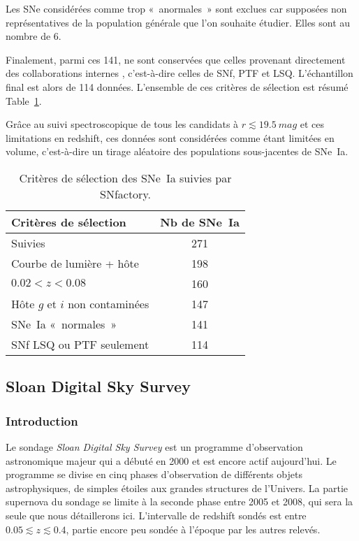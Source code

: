 \documentclass[../main/main.tex]{subfiles}
\begin{document}
Les SNe considérées comme trop «~anormales~» sont exclues car supposées non
représentatives de la population générale que l'on souhaite étudier. Elles sont
au nombre de 6.

Finalement, parmi ces 141, ne sont conservées que celles provenant directement
des collaborations internes , c'est-à-dire
celles de SNf, PTF et LSQ. L'échantillon final est alors de 114 données.  
L'ensemble de ces critères de sélection est résumé Table~\ref{tab:snfcuts}.

Grâce au suivi spectroscopique de tous les candidats à $r \lesssim
\SI{19.5}{mag}$ et ces limitations en redshift, ces données sont considérées
comme étant limitées en volume, c'est-à-dire un tirage aléatoire des populations
sous-jacentes de SNe~Ia.

\begin{table}[]
    \centering
    \caption{Critères de sélection des SNe~Ia suivies par SNfactory.}
    \label{tab:snfcuts}
    \begin{tabular}{lc}
        \toprule
        Critères de sélection           & Nb de SNe~Ia \\
        \midrule
        Suivies                         & 271 \\
        Courbe de lumière + hôte        & 198 \\
        $0.02 < z < 0.08$               & 160 \\
        Hôte $g$ et $i$ non contaminées & 147 \\
        SNe~Ia «~normales~»             & 141 \\
        SNf LSQ ou PTF seulement        & 114 \\
        \bottomrule
    \end{tabular}
\end{table}

\subsection{Sloan Digital Sky Survey}\label{ssec:sdss}
\subsubsection{Introduction}\label{sssec:sdssintro}

Le sondage \textit{Sloan Digital Sky Survey} \citep[SDSS,][?]{sako2008} est un
programme d'observation astronomique majeur qui a débuté en 2000 et est encore
actif aujourd'hui. Le programme se divise en cinq phases d'observation de
différents objets astrophysiques, de simples étoiles aux grandes structures de
l'Univers. La partie supernova du sondage se limite à la seconde phase entre
2005 et 2008, qui sera la seule que nous détaillerons ici. L'intervalle de
redshift sondés est entre $0.05 \lesssim z \lesssim 0.4$, partie encore peu
sondée à l'époque par les autres relevés.
\end{document}
